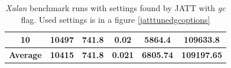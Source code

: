 \documentclass[
  digital, %
  oneside,
  notable, %
  nolof,     %
  nolot     %
]{fithesis3}
\begin{document}
\begin{table}[]
\begin{tabular}{|c|c|c|c|c|c|}
		10               & 10497                                                        & 741.8                                                                  & 0.02                                                                   & 5864.4                                                               & 109633.8                                                        \\ \hline
		\textbf{Average} & \textbf{10415}                                               & \textbf{741.8}                                                         & \textbf{0.021}                                                         & \textbf{6805.74}                                                     & \textbf{109197.65}                                              \\ \hline
	\end{tabular}
	\caption{\textit{Xalan} benchmark runs with settings found by JATT with \textit{gc} flag. Used settings is in a figure \ref{jatttunedgcoptions}}
	\label{jattgcresults}
\end{table}
\end{document}
